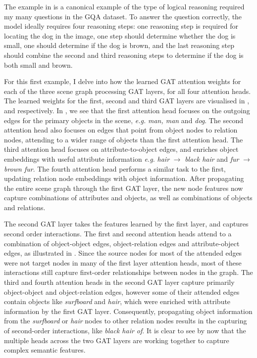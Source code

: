 The example in \figureautorefname{ \ref{fig:positive_logical_sample}} is a canonical example of the type of logical reasoning required my many questions in the GQA dataset. To answer the question correctly, the model ideally requires four reasoning steps: one reasoning step is required for locating the dog in the image, one step should determine whether the dog is small, one should determine if the dog is brown, and the last reasoning step should combine the second and third reasoning steps to determine if the dog is both small and brown.

For this first example, I delve into how the learned GAT attention weights for each of the three scene graph processing GAT layers, for all four attention heads. The learned weights for the first, second and third GAT layers are visualised in \figureautorefname{ \ref{fig:positive_logical_gat_l0}}, \figureautorefname{ \ref{fig:positive_logical_gat_l1}} and \figureautorefname{ \ref{fig:positive_logical_gat_l2}} respectively. In \figureautorefname{ \ref{fig:positive_logical_gat_l0}}, we see that the first attention head focuses on the outgoing edges for the primary objects in the scene, \textit{e.g.} \textit{man, man} and \textit{dog}. The second attention head also focuses on edges that point from object nodes to relation nodes, attending to a wider range of objects than the first attention head. The third attention head focuses on attribute-to-object edges, and enriches object embeddings with useful attribute information \textit{e.g.} \textit{hair} \(\rightarrow\) \textit{black hair} and \textit{fur} \(\rightarrow\) \textit{brown fur}. The fourth attention head performs a similar task to the first, updating relation node embeddings with object information. After propagating the entire scene graph through the first GAT layer, the new node features now capture combinations of attributes and objects, as well as combinations of objects and relations. 
 
The second GAT layer takes the features learned by the first layer, and captures second order interactions. The first and second attention heads attend to a combination of object-object edges, object-relation edges and attribute-object edges, as illustrated in \figureautorefname{ \ref{fig:positive_logical_gat_l1}}. Since the source nodes for most of the attended edges were not target nodes in many of the first layer attention heads, most of these interactions still capture first-order relationships between nodes in the graph. The third and fourth attention heads in the second GAT layer capture primarily object-object and object-relation edges, however some of their attended edges contain objects like \textit{surfboard} and \textit{hair}, which were enriched with attribute information by the first GAT layer. Consequently, propagating object information from the \textit{surfboard} or \textit{hair} nodes to other relation nodes results in the capturing of second-order interactions, like \textit{black hair of}. It is clear to see by now that the multiple heads across the two GAT layers are working together to capture complex semantic features.

